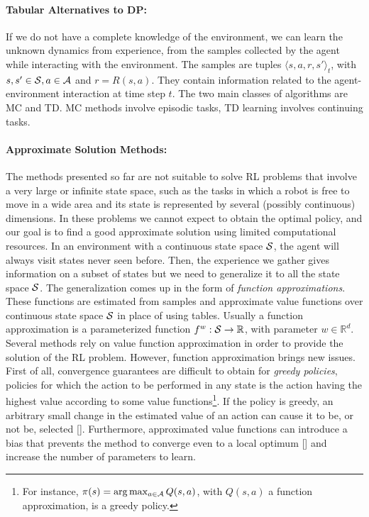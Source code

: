\paragraph{Tabular Alternatives to DP:}\label{subsec:alt}
If we do not have a complete knowledge of the environment, we can learn the unknown dynamics from experience, \ie from the samples collected by the agent while interacting with the environment. The samples are tuples $\langle s,a,r,s' \rangle_t$, with $s, s' \in \mathcal{S}, a \in \mathcal{A}$ and $r = R(s,a)$. They contain information related to the agent-environment interaction at time step $t$. The two main classes of algorithms are \acf{MC} and \acf{TD}. \ac{MC} methods involve episodic tasks, \ac{TD} learning involves continuing tasks. 

\paragraph{Approximate Solution Methods:}
The methods presented so far are not suitable to solve \ac{RL} problems that involve a very large or infinite state space, such as the tasks in which a robot is free to move in a wide area and its state is represented by several (possibly continuous) dimensions. In these problems we cannot expect to obtain the optimal policy, and our goal is to find a good approximate solution using limited computational resources. In an environment with a continuous state space $\mathcal{S}$, the agent will always visit states never seen before. Then, the experience we gather gives information on a subset of states but we need to generalize it to all the state space $\mathcal{S}$. The generalization comes up in the form of \emph{function approximations}. These functions are estimated from samples and approximate value functions over continuous state space $\mathcal{S}$ in place of using tables. Usually a function approximation is a parameterized function $f^{w}: \mathcal{S} \to \mathbb{R}$, with parameter $w \in \mathbb{R}^{d}$.\\
\newline
Several methods rely on value function approximation in order to provide the solution of the \ac{RL} problem. However, function approximation brings new issues. First of all, convergence guarantees are difficult to obtain for \emph{greedy policies}, \ie policies for which the action to be performed in any state is the action having the highest value according to some value functions\footnote{For instance, $\pi(s) = \arg \max_{a \in \mathcal{A}}Q(s,a)$, with $Q(s,a)$ a function approximation, is a greedy policy.}. If the policy is greedy, an arbitrary small change in the estimated value of an action can cause it to be, or not be, selected [\cite{Sutton1999PolicyGM}]. Furthermore, approximated value functions can introduce a bias that prevents the method to converge even to a local optimum [\cite{deisenroth2013Survey}] and increase the number of parameters to learn.

